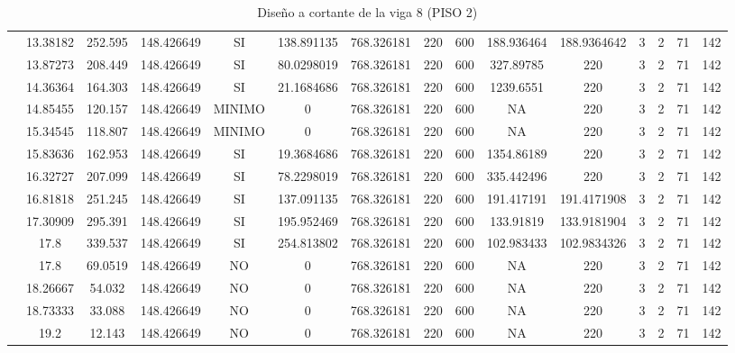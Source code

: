\begin{table}[H]
{\begin{tabular}{|c|c|c|c|c|c|c|c|c|c|c|c|c|c|c|}
\cline{2-15}    & 13.38182 & 252.595 & 148.426649 & SI  & 138.891135 & 768.326181 & 220 & 600 & 188.936464 & 188.9364642 & 3   & 2   & 71  & 142 \bigstrut\\
\cline{2-15}    & 13.87273 & 208.449 & 148.426649 & SI  & 80.0298019 & 768.326181 & 220 & 600 & 327.89785 & 220 & 3   & 2   & 71  & 142 \bigstrut\\
\cline{2-15}    & 14.36364 & 164.303 & 148.426649 & SI  & 21.1684686 & 768.326181 & 220 & 600 & 1239.6551 & 220 & 3   & 2   & 71  & 142 \bigstrut\\
\cline{2-15}    & 14.85455 & 120.157 & 148.426649 & MINIMO & 0   & 768.326181 & 220 & 600 & NA  & 220 & 3   & 2   & 71  & 142 \bigstrut\\
\cline{2-15}    & 15.34545 & 118.807 & 148.426649 & MINIMO & 0   & 768.326181 & 220 & 600 & NA  & 220 & 3   & 2   & 71  & 142 \bigstrut\\
\cline{2-15}    & 15.83636 & 162.953 & 148.426649 & SI  & 19.3684686 & 768.326181 & 220 & 600 & 1354.86189 & 220 & 3   & 2   & 71  & 142 \bigstrut\\
\cline{2-15}    & 16.32727 & 207.099 & 148.426649 & SI  & 78.2298019 & 768.326181 & 220 & 600 & 335.442496 & 220 & 3   & 2   & 71  & 142 \bigstrut\\
\cline{2-15}    & 16.81818 & 251.245 & 148.426649 & SI  & 137.091135 & 768.326181 & 220 & 600 & 191.417191 & 191.4171908 & 3   & 2   & 71  & 142 \bigstrut\\
\cline{2-15}    & 17.30909 & 295.391 & 148.426649 & SI  & 195.952469 & 768.326181 & 220 & 600 & 133.91819 & 133.9181904 & 3   & 2   & 71  & 142 \bigstrut\\
\cline{2-15}    & 17.8 & 339.537 & 148.426649 & SI  & 254.813802 & 768.326181 & 220 & 600 & 102.983433 & 102.9834326 & 3   & 2   & 71  & 142 \bigstrut\\
\cline{2-15}    & 17.8 & 69.0519 & 148.426649 & NO  & 0   & 768.326181 & 220 & 600 & NA  & 220 & 3   & 2   & 71  & 142 \bigstrut\\
\cline{2-15}    & 18.26667 & 54.032 & 148.426649 & NO  & 0   & 768.326181 & 220 & 600 & NA  & 220 & 3   & 2   & 71  & 142 \bigstrut\\
\cline{2-15}    & 18.73333 & 33.088 & 148.426649 & NO  & 0   & 768.326181 & 220 & 600 & NA  & 220 & 3   & 2   & 71  & 142 \bigstrut\\
\cline{2-15}    & 19.2 & 12.143 & 148.426649 & NO  & 0   & 768.326181 & 220 & 600 & NA  & 220 & 3   & 2   & 71  & 142 \bigstrut\\
\hline
\end{tabular}%



  }%
    \caption{Diseño a cortante de la viga 8 (PISO 2) }
  \label{tab:C VG8 P2 }%
\end{table}%
